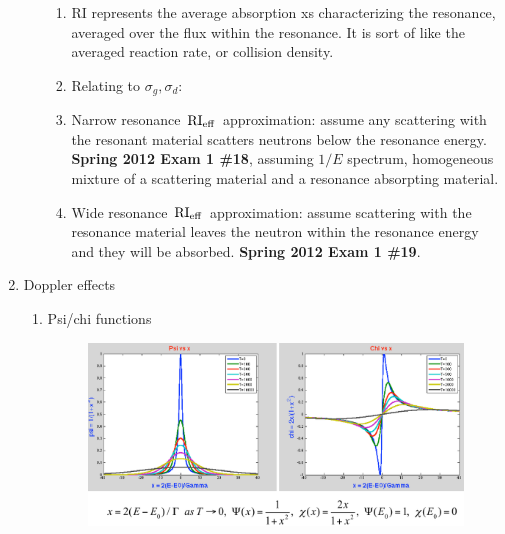 \documentclass{school-22.211-notes}
\begin{document}
\begin{enumerate}
\begin{enumerate}
\begin{enumerate}
      \item RI represents the average absorption xs characterizing the resonance, averaged over the flux within the resonance. It is sort of like the averaged reaction rate, or collision density. 
        
      \item Relating to $\sigma_g, \sigma_d$: 

      \item Narrow resonance $\left. \mathrm{RI}_{\mathrm{eff}} \right.$ approximation: assume any scattering with the resonant material scatters neutrons below the resonance energy. 
        \textbf{Spring 2012 Exam 1 \#18}, assuming $1/E$ spectrum, homogeneous mixture of a scattering material and a resonance absorpting material. 
        
      \item Wide resonance $\left. \mathrm{RI}_{\mathrm{eff}} \right.$ approximation: assume scattering with the resonance material leaves the neutron within the resonance energy and they will be absorbed. \textbf{Spring 2012 Exam 1 \#19}.
      \end{enumerate}
  \end{enumerate}

\item Doppler effects
  \begin{enumerate}
    \item Psi/chi functions

      \begin{figure}[ht]
        \centering
        \includegraphics[width=6in]{images/r-m/psi-chi-plot.png}
      \end{figure}


\end{enumerate}
\end{enumerate}
\end{document}
